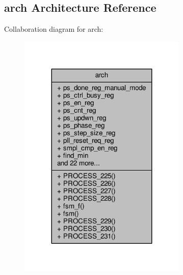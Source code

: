 \subsection{arch Architecture Reference}
\label{classpll__ps__fsm_1_1arch}


Collaboration diagram for arch\+:\nopagebreak
\begin{figure}[H]
\begin{center}
\leavevmode
\includegraphics[width=227pt]{d5/d81/classpll__ps__fsm_1_1arch__coll__graph}
\end{center}
\end{figure}
